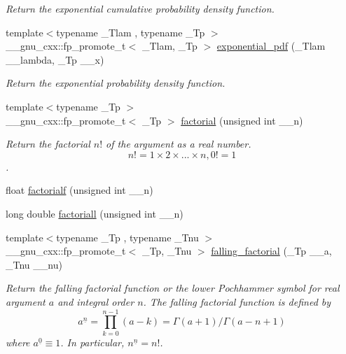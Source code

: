 \begin{DoxyCompactItemize}
\begin{DoxyCompactList}\small\item\em Return the exponential cumulative probability density function. \end{DoxyCompactList}\item 
{\footnotesize template$<$typename \+\_\+\+Tlam , typename \+\_\+\+Tp $>$ }\\\+\_\+\+\_\+gnu\+\_\+cxx\+::fp\+\_\+promote\+\_\+t$<$ \+\_\+\+Tlam, \+\_\+\+Tp $>$ \hyperlink{group__gnu__math__spec__func_ga7f35499a94fd8930810809988332161e}{exponential\+\_\+pdf} (\+\_\+\+Tlam \+\_\+\+\_\+lambda, \+\_\+\+Tp \+\_\+\+\_\+x)
\begin{DoxyCompactList}\small\item\em Return the exponential probability density function. \end{DoxyCompactList}\item 
{\footnotesize template$<$typename \+\_\+\+Tp $>$ }\\\+\_\+\+\_\+gnu\+\_\+cxx\+::fp\+\_\+promote\+\_\+t$<$ \+\_\+\+Tp $>$ \hyperlink{group__gnu__math__spec__func_ga963b1612f50b0964f5f42c9f289aab68}{factorial} (unsigned int \+\_\+\+\_\+n)
\begin{DoxyCompactList}\small\item\em Return the factorial $ n! $ of the argument as a real number. \[ n! = 1 \times 2 \times ... \times n, 0! = 1 \]. \end{DoxyCompactList}\item 
float \hyperlink{group__gnu__math__spec__func_ga5a288283a8ed63e1d2b0145f313a5378}{factorialf} (unsigned int \+\_\+\+\_\+n)
\item 
long double \hyperlink{group__gnu__math__spec__func_ga0904e504fdc3c8b9b6f5c66a73531584}{factoriall} (unsigned int \+\_\+\+\_\+n)
\item 
{\footnotesize template$<$typename \+\_\+\+Tp , typename \+\_\+\+Tnu $>$ }\\\+\_\+\+\_\+gnu\+\_\+cxx\+::fp\+\_\+promote\+\_\+t$<$ \+\_\+\+Tp, \+\_\+\+Tnu $>$ \hyperlink{group__gnu__math__spec__func_ga3cc8eb6068c7155ec48b40e20160c5c0}{falling\+\_\+factorial} (\+\_\+\+Tp \+\_\+\+\_\+a, \+\_\+\+Tnu \+\_\+\+\_\+nu)
\begin{DoxyCompactList}\small\item\em Return the falling factorial function or the lower Pochhammer symbol for real argument $ a $ and integral order $ n $. The falling factorial function is defined by \[ a^{\underline{n}} = \prod_{k=0}^{n-1} (a - k) = \Gamma(a + 1) / \Gamma(a - n + 1) \] where $ a^{\underline{0}} \equiv 1 $. In particular, $ n^{\underline{n}} = n! $. \end{DoxyCompactList}\item 

\end{DoxyCompactItemize}
